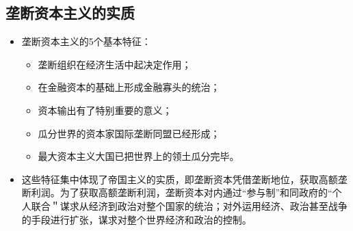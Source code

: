 \documentclass[12pt,openany]{ctexbook}
\begin{document}
\subsection{垄断资本主义的实质}
\begin{itemize}
  \item 垄断资本主义的5个基本特征：
\begin{itemize}
  \item 垄断组织在经济生活中起决定作用；
  \item 在金融资本的基础上形成金融寡头的统治；
  \item 资本输出有了特别重要的意义；
  \item 瓜分世界的资本家国际垄断同盟已经形成；
  \item 最大资本主义大国已把世界上的领土瓜分完毕。
\end{itemize}
  \item 这些特征集中体现了帝国主义的实质，即垄断资本凭借垄断地位，获取高额垄断利润。为了获取高额垄断利润，垄断资本对内通过“参与制”和同政府的“个人联合＂谋求从经济到政治对整个国家的统治；对外运用经济、政治甚至战争的手段进行扩张，谋求对整个世界经济和政治的控制。
\end{itemize}
\end{document}
